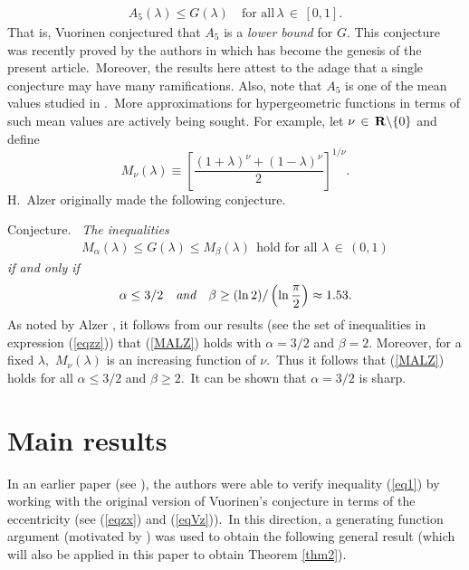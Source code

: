 \documentclass[final,oneeqnum]{siamltex}
\begin{document}
\begin{eqnarray} 
A_{5}(\lambda) \leq G(\lambda)\quad
 \mbox{for all}\,\lambda \,\in \,[0,1] \label{eq1}.
\end{eqnarray} 
That is, Vuorinen conjectured that $A_{5}$
is a {\em lower bound} for $G$.
This conjecture was recently proved by the authors in \cite{BPR}
which has become
 the genesis of
  the present article.\  Moreover, the results here attest to the adage that
a single
conjecture may have many ramifications.
Also, note that $A_5$ is one of the
mean values studied in \cite{VV}.\ More approximations for
hypergeometric functions  in terms of such mean values are actively being
sought.
For example, let $\nu \,\in \,{\bf R}\backslash\{0\}$  and
define 
\[
M_{\nu}(\lambda) \equiv
\left[\frac{(1+\lambda)^\nu +(1-\lambda)^\nu}{2}\right ]^{1/\nu}.
\]
H.\ Alzer \cite{ALZER} originally made  the following conjecture.

{\sc Conjecture}.\ {\em
The inequalities \begin{eqnarray} M_{\alpha}(\lambda) \leq
G(\lambda) \leq
M_{\beta}(\lambda) \ \ \mbox{hold  for all $\lambda \,\in\, (0,1)$}
\label{MALZ}
\end{eqnarray}
if and only if} 
\[
\alpha \leq 3/2\quad \mbox{{\em and}}\quad \beta \geq (\ln 2)/ \left(\ln
\frac{\pi}{2}\right) \approx 1.53.
\]
As noted by Alzer \cite{ALZER}, it follows from our results
(see the set of inequalities in  expression
(\ref{eqzz}))
that  (\ref{MALZ}) holds with
$\alpha = 3/2$ and $\beta =2$.
Moreover,  for a fixed $\lambda,$  $M_{\nu}(\lambda)$ is an increasing function
of $\nu$.\ Thus  it
follows  that (\ref{MALZ}) holds for all $\alpha \leq 3/2$
and $\beta \geq 2$.\ It can be shown that $\alpha = 3/2$ is
sharp.%

\section{Main results}

\noindent  In an earlier paper (see \cite{BPR}),  the authors
were able to verify  inequality (\ref{eq1}) by
working with the original version of  Vuorinen's
conjecture   in  terms of the eccentricity
(see (\ref{eqzx}) and (\ref{eqVz})).\ In this direction,
a generating function argument (motivated by \cite{AG}) was used  to
obtain the following general result (which will also  be applied in
this paper to obtain Theorem \ref{thm2}).
\end{document}

